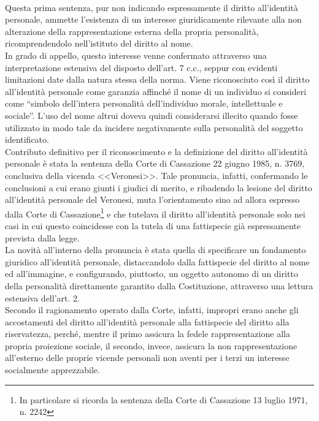 \\Questa prima sentenza, pur non indicando espressamente il diritto all'identità personale, ammette l'esistenza di un interesse giuridicamente rilevante alla non alterazione della rappresentazione esterna della propria personalità, ricomprendendolo nell'istituto del diritto al nome. \\In grado di appello, questo interesse venne confermato attraverso una interpretazione estensiva del disposto dell'art. 7 c.c., seppur con evidenti limitazioni date dalla natura stessa della norma.
Viene riconosciuto così il diritto all’identità personale come garanzia affinché il nome di un individuo si consideri come “simbolo dell'intera personalità dell'individuo morale, intellettuale e sociale”.
L'uso del nome altrui doveva quindi considerarsi illecito quando fosse utilizzato in modo tale da incidere negativamente sulla personalità del soggetto identificato. 
\\Contributo definitivo per il riconoscimento e la definizione del diritto all'identità personale è stata la sentenza della Corte di Cassazione 22  giugno  1985, n. 3769, conclusiva della vicenda <<Veronesi>>.
Tale pronuncia, infatti, confermando le conclusioni a cui erano giunti i giudici di merito, e ribadendo la lesione del diritto all’identità personale del Veronesi, muta l’orientamento sino ad allora espresso dalla Corte di Cassazione\footnote{In particolare si ricorda la sentenza della Corte di Cassazione 13 luglio 1971, n. 2242} e che tutelava il diritto all’identità personale solo nei casi in cui questo coincidesse con la tutela di una fattispecie già espressamente prevista dalla legge. 
\\La novità all'interno della pronuncia è stata quella di specificare un fondamento giuridico all’identità personale, distaccandolo dalla fattispecie del diritto al nome ed all’immagine, e configurando, piuttosto, un oggetto autonomo di un diritto della personalità direttamente garantito dalla Costituzione, attraverso una lettura estensiva dell'art. 2. %
\\Secondo il ragionamento operato dalla Corte, infatti, impropri erano anche gli accostamenti del diritto all’identità personale alla fattispecie del diritto alla riservatezza, perché, mentre il primo assicura la fedele rappresentazione alla propria proiezione sociale, il secondo, invece, assicura la non rappresentazione all’esterno delle proprie vicende personali non aventi per i terzi un interesse socialmente apprezzabile. 
